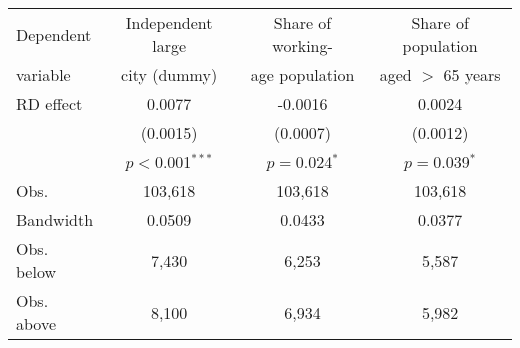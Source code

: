 \begin{tabular}{lccc}
  \toprule
 \midrule
Dependent & Independent large & Share of working- & Share of population \\ 
variable & city (dummy) & age population & aged $>$ 65 years \\ 
  \midrule
\acs{RD} effect &   0.0077 &  -0.0016 &   0.0024 \\ 
    &  (0.0015) &  (0.0007) &  (0.0012) \\ 
   & $p<$0.001$^{***}$ & $p=$0.024$^{*}$ & $p=$0.039$^{*}$ \\ 
   \midrule
\acs{Obs.} & 103,618 & 103,618 & 103,618 \\ 
Bandwidth & 0.0509 & 0.0433 & 0.0377 \\ 
  \acs{Obs.} below &  7,430 &  6,253 &  5,587 \\ 
  \acs{Obs.} above &  8,100 &  6,934 &  5,982 \\ 
   \midrule
 \bottomrule
\end{tabular}
